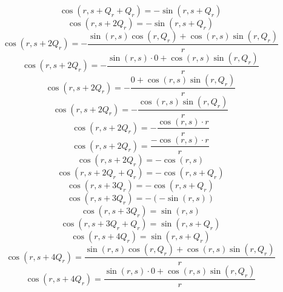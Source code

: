 \documentclass[a4paper,12pt]{report}
\begin{document}
\begin{equation}
\cos(r,s + Q_r + Q_r) = -\sin(r,s + Q_r)
\end{equation}
\begin{equation}
\cos(r,s + 2Q_r) = -\sin(r,s + Q_r)
\end{equation}
\begin{equation}
\cos(r,s + 2Q_r) = -\frac{\sin(r,s) \cos(r,Q_r) + \cos(r,s) \sin(r,Q_r)}{r}
\end{equation}
\begin{equation}
\cos(r,s + 2Q_r) = -\frac{\sin(r,s) \cdot 0 + \cos(r,s) \sin(r,Q_r)}{r}
\end{equation}
\begin{equation}
\cos(r,s + 2Q_r) = -\frac{0 + \cos(r,s) \sin(r,Q_r)}{r}
\end{equation}
\begin{equation}
\cos(r,s + 2Q_r) = -\frac{\cos(r,s) \sin(r,Q_r)}{r}
\end{equation}
\begin{equation}
\cos(r,s + 2Q_r) = -\frac{\cos(r,s) \cdot r}{r}
\end{equation}
\begin{equation}
\cos(r,s + 2Q_r) = \frac{-\cos(r,s) \cdot r}{r}
\end{equation}
\begin{equation}
\cos(r,s + 2Q_r) = -\cos(r,s)
\end{equation}
\begin{equation}
\cos(r,s + 2Q_r + Q_r) = -\cos(r,s + Q_r)
\end{equation}
\begin{equation}
\cos(r,s + 3Q_r) = -\cos(r,s + Q_r)
\end{equation}
\begin{equation}
\cos(r,s + 3Q_r) = -(-\sin(r,s))
\end{equation}
\begin{equation}
\cos(r,s + 3Q_r) = \sin(r,s)
\end{equation}
\begin{equation}
\cos(r,s + 3Q_r + Q_r) = \sin(r,s + Q_r)
\end{equation}
\begin{equation}
\cos(r,s + 4Q_r) = \sin(r,s + Q_r)
\end{equation}
\begin{equation}
\cos(r,s + 4Q_r) = \frac{\sin(r,s) \cos(r,Q_r) + \cos(r,s) \sin(r,Q_r)}{r}
\end{equation}
\begin{equation}
\cos(r,s + 4Q_r) = \frac{\sin(r,s) \cdot 0 + \cos(r,s) \sin(r,Q_r)}{r}
\end{equation}
\end{document}
